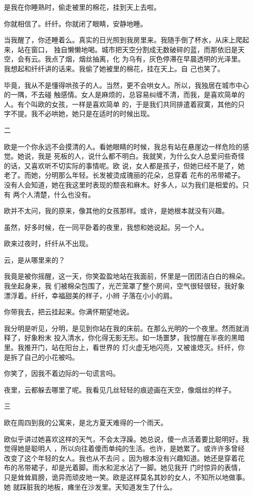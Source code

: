 \documentclass[12pt,a4paper]{article}
\newcommand{\subpart}[1]{
	\begingroup \par
	\vspace{1ex} \centering #1
	\par \endgroup \nopagebreak[4]
}
\begin{document}
		是我在你睡熟时，偷走被里的棉花，挂到天上去啦。

		你就相信了。纤纤。你就闭了眼睛，安静地睡。

		当我醒了，你还睡着么。真实的日光照到我房里来。我随手倒了杯水，从床上爬起来，站在窗口，
	独自懒懒地喝。城市把天空分割成无数破碎的蓝，而那依旧是天空，会有云。我点了烟，烟丝抽离，化
	为乌有，灰色停滞在早晨透明的光泽里。我想起和纤纤讲的话来。我偷了她被里的棉花，挂在天上。自
	己也笑了。

		毕竟，我从不是懂得哄孩子的人。当然，更不会哄女人。所以，我独居在城市中心的一隅，不去碰
	触感情。女人是麻烦的，总容易纠缠不清，而我，是喜欢简单的人。有个叫欧的女孩，一样是喜欢简单
	的，于是我们共同排遣着寂寞，其他的只字不提。我不必哄她，她只是在适时的时候出现。

		\subpart{二}

		欧是一个你永远不会摸清的人。看她眼睛的时候，我总有站在悬崖边一样危险的感觉。她说，我是
	死板的人，说什么都不明白。我就笑，为什么女人总爱问些奇怪的话，又喜欢听不切实际的事情呢。欧
	说，女人都是孩子，但她已经不是了，她老了。而她，分明那么年轻。长发被烫成瑰丽的花朵，总穿着
	花布的吊带裙子。没有人会知道，她在我这里时表现的颓丧和麻木。好多人，以为我们是相爱的。只有
	两个人清楚，什么也没有。

		欧并不太问，我的原来，像其他的女孩那样。或许，是她根本就没有兴趣。\par
		虽然，好多时候，在一同平卧着的夜里，我想和她说起。另一个人。\par
		欧来过夜时，纤纤从不出现。\par
		云，是从哪里来的？

		我竟是被你摇醒，这一天，你笑盈盈地站在我面前，怀里是一团团洁白白的棉朵。我坐起身来，我
	们被棉朵包围了，光芒笼罩了整个房间，空气很轻很轻，我好象漂浮着。纤纤，幸福甜美的样子，小辫
	子落在小小的肩。

		你带我去，把云挂起来。你满怀期望地说。

		我分明是听见，分明，是见到你站在我的床前。在那么光明的一个夜里。然而就消释了，好象粉末
	投入清水，你化得无影无形。如一场噩梦，我惊醒在半夜的黑暗里。我推开门，站在阳台上，看世界的
	灯火虚无地闪亮，又被谁熄灭。纤纤，你是拆了自己的小花被吗。

		你笑了，因我不着边际的一句谎言吗。\par
		夜里，云都躲去哪里了呢。我看见几丝轻轻的痕迹画在天空，像烟丝的样子。

		\subpart{三}

		欧在周四到我的公寓来，是北方夏天难得的一个雨天。

		欧似乎讲过她喜欢这样的天气，不会太浮躁。她总说，傻一点活着要比聪明好。我觉得她是聪明人
	，所以向往着傻而单纯的生活。也许，是她累了。或许许多曾经改变了这个年轻的女人。我也从不去问
	。因为根本没有兴趣知道。她还是穿着花布的吊带裙子，却是光着脚。雨水和泥水沾了一脚。她见我开
	门时惊异的表情，只是耸耸肩膀，诡异而顽皮地一笑。欧是这样莫名其妙的女人，不知所以地做事。她
	就踩脏我的地板，瘫坐在沙发里。天知道发生了什么。
\end{document}
